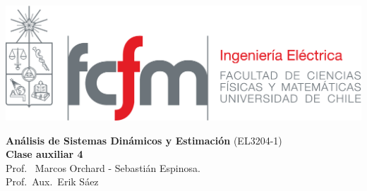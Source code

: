 \documentclass[
  11pt,
  letterpaper,
   addpoints,
  answers
  ]{exam}
\begin{document}
\noindent
\begin{minipage}{0.47\textwidth}
\includegraphics[width=\textwidth]{../fcfm_die}
\end{minipage}
\begin{minipage}{0.53\textwidth}
\begin{center} 
\large\textbf{Análisis de Sistemas Dinámicos y Estimación} (EL3204-1) \\
\large\textbf{Clase auxiliar 4} \\
\normalsize Prof.~ Marcos Orchard - Sebastián Espinosa.\\
\normalsize Prof.~Aux.~Erik Sáez
\end{center}
\end{minipage}

\vspace{0.5cm}
\noindent
\vspace{.85cm}
\end{document}
